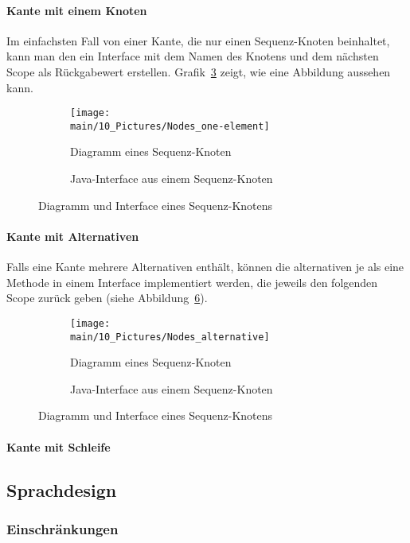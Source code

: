 \documentclass[../InterneDSLs.tex]{subfiles}
\begin{document}
\paragraph{Kante mit einem Knoten}
Im einfachsten Fall von einer Kante, die nur einen Sequenz-Knoten beinhaltet, kann man den ein Interface mit dem Namen des Knotens und dem nächsten Scope als Rückgabewert erstellen. Grafik~\ref{FIG:SequenceNode} zeigt, wie eine Abbildung aussehen kann.
\begin{figure}[ht]
\centering
  \begin{subfigure}[b]{0.49\textwidth}
    \texttt{[image: \\main/10\_Pictures/Nodes\_one-element]}
    \caption{Diagramm eines Sequenz-Knoten}
    \label{FIG:DiagramSequenceNode}
  \end{subfigure}
  \begin{subfigure}[b]{0.49\textwidth}
    
    \caption{Java-Interface aus einem Sequenz-Knoten}
    \label{FIG:JInterfaceSequenceNode}
  \end{subfigure}
  \caption{Diagramm und Interface eines Sequenz-Knotens}
  \label{FIG:SequenceNode}
\end{figure}

\paragraph{Kante mit Alternativen}
Falls eine Kante mehrere Alternativen enthält, können die alternativen je als eine Methode in einem Interface implementiert werden, die jeweils den folgenden Scope zurück geben (siehe Abbildung~\ref{FIG:AlternativeNode}).
\begin{figure}[ht]
\centering
  \begin{subfigure}[b]{0.49\textwidth}
    \texttt{[image: \\main/10\_Pictures/Nodes\_alternative]}
    \caption{Diagramm eines Sequenz-Knoten}
    \label{FIG:DiagramAlternativeNode}
  \end{subfigure}
  \begin{subfigure}[b]{0.49\textwidth}
    
    \caption{Java-Interface aus einem Sequenz-Knoten}
    \label{FIG:JInterfaceAlternativeNode}
  \end{subfigure}
  \caption{Diagramm und Interface eines Sequenz-Knotens}
  \label{FIG:AlternativeNode}
\end{figure}

\paragraph{Kante mit Schleife}


\subsection{Sprachdesign}


\subsubsection{Einschränkungen}
\end{document}
